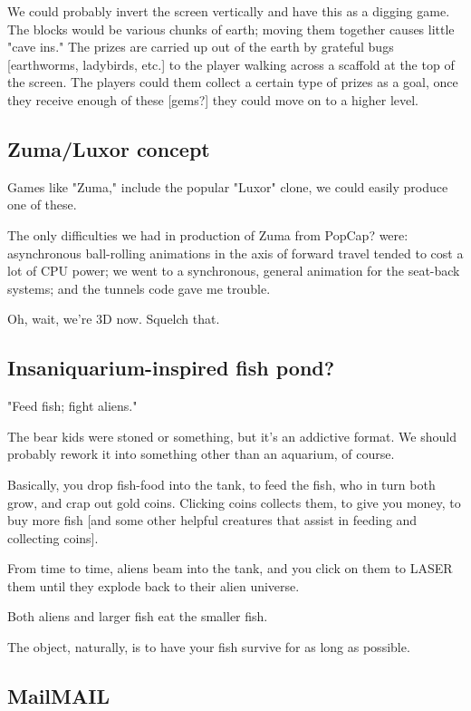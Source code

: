 \documentclass[11pt]{article}
\begin{document}
We could probably invert the screen vertically and have this as a
digging game. The blocks would be various chunks of earth; moving them
together causes little "cave ins." The prizes are carried up out of
the earth by grateful bugs [earthworms, ladybirds, etc.] to the player
walking across a scaffold at the top of the screen. The players could
them collect a certain type of prizes as a goal, once they receive
enough of these [gems?] they could move on to a higher level.
\subsection{Zuma/Luxor concept}
\label{sec-3-7}

Games like "Zuma," include the popular "Luxor" clone, we could easily
produce one of these.

The only difficulties we had in production of Zuma from PopCap? were:
asynchronous ball-rolling animations in the axis of forward travel
tended to cost a lot of CPU power; we went to a synchronous, general
animation for the seat-back systems; and the tunnels code gave
me trouble.  

Oh, wait, we're 3D now. Squelch that.
\subsection{Insaniquarium-inspired fish pond?}
\label{sec-3-8}

"Feed fish; fight aliens."

The bear kids were stoned or something, but it's an addictive
format. We should probably rework it into something other than an
aquarium, of course.

Basically, you drop fish-food into the tank, to feed the fish, who in
turn both grow, and crap out gold coins. Clicking coins collects them,
to give you money, to buy more fish [and some other helpful creatures
that assist in feeding and collecting coins].

From time to time, aliens beam into the tank, and you click on them
to LASER them until they explode back to their alien universe.

Both aliens and larger fish eat the smaller fish.

The object, naturally, is to have your fish survive for as long
as possible. 
\subsection{Mail\hfill{}\textsc{MAIL}}
\label{sec-3-9}
\end{document}

